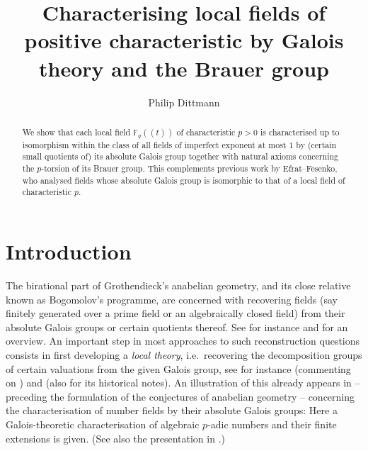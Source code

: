 \documentclass[a4paper, british, oneside]{amsart}
\author{Philip Dittmann}
\title[Characterising local fields by Galois theory and the Brauer group]{Characterising local fields of positive characteristic by Galois theory and the Brauer group}
\newcommand{\F}{\mathbb{F}}
\newcommand{\pow}[1]{(\!(#1)\!)}
\theoremstyle{definition}
\theoremstyle{remark}
\begin{document}
\begin{abstract}
  We show that each local field $\F_q\pow{t}$ of characteristic
  $p > 0$ is characterised up to isomorphism within the class of all
  fields of imperfect exponent at most $1$ by (certain small quotients
  of) its absolute Galois group together with natural axioms
  concerning the $p$-torsion of its Brauer group.  This complements
  previous work by Efrat--Fesenko, who analysed fields whose absolute
  Galois group is isomorphic to that of a local field of
  characteristic $p$.
\end{abstract}


\maketitle

\section{Introduction}

The birational part of Grothendieck's anabelian geometry,
and its close relative known as Bogomolov's programme,
are concerned with recovering fields
(say finitely generated over a prime field or an algebraically closed field)
from their absolute Galois groups or certain quotients thereof.
See for instance \cite[Chapter XII, §3]{NSW} and \cite[§2]{Szamuely_BourbakiPop} for an overview.
An important step in most approaches to such reconstruction questions
consists in first developing a \emph{local theory},
i.e.\ recovering the decomposition groups of certain valuations
from the given Galois group,
see for instance \cite[§3]{Szamuely_BourbakiPop}
(commenting on \cite{Pop_GrothendiecksConjectureBirationalAnabelian}) and
\cite{Pop_BirationalAnabelianProgramBogomolovI} (also for its historical notes).
An illustration of this already appears in \cite{Neukirch_KennzeichnungPAdischEndlichAlgebraisch} --
preceding the formulation of the conjectures of anabelian geometry --
concerning the characterisation of number fields by their absolute Galois groups:
Here a Galois-theoretic characterisation of algebraic $p$-adic numbers
and their finite extensions is given.
(See also the presentation in \cite[Chapter XII, §§1--2]{NSW}.)
\end{document}

